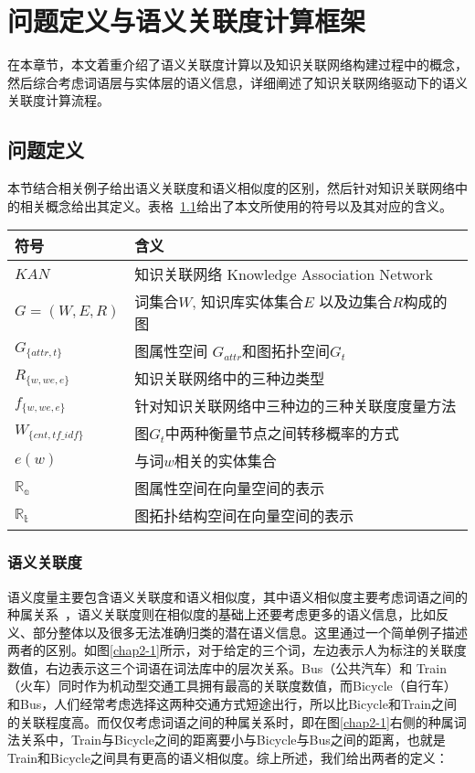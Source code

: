 \chapter{问题定义与语义关联度计算框架}
\label{chap:chap02}
在本章节，本文着重介绍了语义关联度计算以及知识关联网络构建过程中的概念，然后综合考虑词语层与实体层的语义信息，详细阐述了知识关联网络驱动下的语义关联度计算流程。

\section{问题定义}
本节结合相关例子给出语义关联度和语义相似度的区别，然后针对知识关联网络中的相关概念给出其定义。表格~\ref{symbols}给出了本文所使用的符号以及其对应的含义。
\begin{table}[!ht]
    \center
    \vspace{5pt}
    \begin{tabular}{|p{2.5cm}|p{9cm}|}
    \hline
    \bf{符号} & \bf{含义} \\ \hline
    $KAN$ & 知识关联网络 Knowledge Association Network \\ \hline
    $G = (W, E, R)$ & 词集合$W$, 知识库实体集合$E$ 以及边集合$R$构成的图\\ \hline
    $G_{\{attr, t\}}$ & 图属性空间 $G_{attr}$和图拓扑空间$G_t$ \\ \hline
    $R_{\{w,we,e\}}$ & 知识关联网络中的三种边类型 \\ \hline
    $f_{\{w,we,e\}}$ & 针对知识关联网络中三种边的三种关联度度量方法 \\ \hline
    $W_{\{cnt,tf\_idf\}}$ &图$G_t$中两种衡量节点之间转移概率的方式\\ \hline
    $e(w)$ & 与词$w$相关的实体集合 \\ \hline
    $\mathbb{R_a}$ & 图属性空间在向量空间的表示 \\ \hline
    $\mathbb{R_t}$ & 图拓扑结构空间在向量空间的表示 \\ \hline
    \end{tabular}
    \label{symbols}
\end{table}


\subsection{语义关联度}

语义度量主要包含语义关联度和语义相似度，其中语义相似度主要考虑词语之间的种属关系~\cite{geoinformatica/BallatoreBW14}，语义关联度则在相似度的基础上还要考虑更多的语义信息，比如反义、部分整体以及很多无法准确归类的潜在语义信息。这里通过一个简单例子描述两者的区别。如图\ref{chap2-1}所示，对于给定的三个词，左边表示人为标注的关联度数值，右边表示这三个词语在词法库中的层次关系。Bus（公共汽车）和 Train（火车）同时作为机动型交通工具拥有最高的关联度数值，而Bicycle（自行车）和Bus，人们经常考虑选择这两种交通方式短途出行，所以比Bicycle和Train之间的关联程度高。而仅仅考虑词语之间的种属关系时，即在图\ref{chap2-1}右侧的种属词法关系中，Train与Bicycle之间的距离要小与Bicycle与Bus之间的距离，也就是Train和Bicycle之间具有更高的语义相似度。综上所述，我们给出两者的定义：

